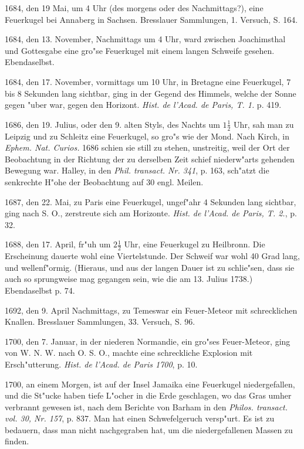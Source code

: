 \documentclass[a4paper, 11pt, oneside, polutonikogreek, german]{article}
\begin{document}
1684, den 19 Mai, um 4 Uhr (des morgens oder des Nachmittags?), eine Feuerkugel bei Annaberg in Sachsen. Bresslauer Sammlungen, 1. Versuch, S. 164.

1684, den 13. November, Nachmittags um 4 Uhr, ward zwischen Joachimsthal und Gottesgabe eine gro"se Feuerkugel mit einem langen Schweife gesehen. Ebendaselbst.

1684, den 17. November, vormittags um 10 Uhr, in Bretagne eine Feuerkugel, 7 bis 8 Sekunden lang sichtbar, ging in der Gegend des Himmels, welche der Sonne gegen "uber war, gegen den Horizont. \emph{Hist. de l'Acad. de Paris, T. 1.} p. 419.

1686, den 19. Julius, oder den 9. alten Styls, des Nachts um $\mathfrak{1\frac{1}{2}}$ Uhr, sah man zu Leipzig und zu Schleitz eine Feuerkugel, so gro"s wie der Mond. Nach Kirch, in \emph{Ephem. Nat. Curios.} 1686 schien sie still zu stehen, unstreitig, weil der Ort der Beobachtung in der Richtung der zu derselben Zeit schief niederw"arts gehenden Bewegung war. Halley, in den \emph{Phil. transact. Nr. 341}, p. 163, sch"atzt die senkrechte H"ohe der Beobachtung auf 30 engl. Meilen.

1687, den 22. Mai, zu Paris eine Feuerkugel, ungef"ahr 4 Sekunden lang sichtbar, ging nach S. O., zerstreute sich am Horizonte. \emph{Hist. de l'Acad. de Paris, T. 2.}, p. 32.

1688, den 17. April, fr"uh um $\mathfrak{2\frac{1}{2}}$ Uhr, eine Feuerkugel zu Heilbronn. Die Erscheinung dauerte wohl eine Viertelstunde. Der Schweif war wohl 40 Grad lang, und wellenf"ormig. (Hieraus, und aus der langen Dauer ist zu schlie"sen, dass sie auch so sprungweise mag gegangen sein, wie die am 13. Julius 1738.) Ebendaselbst p. 74.

1692, den 9. April Nachmittags, zu Temeswar ein Feuer-Meteor mit schrecklichen Knallen. Bresslauer Sammlungen, 33. Versuch, S. 96.

1700, den 7. Januar, in der niederen Normandie, ein gro"ses Feuer-Meteor, ging von W. N. W. nach O. S. O., machte eine schreckliche Explosion mit Ersch"utterung. \emph{Hist. de l'Acad. de Paris 1700}, p. 10.

1700, an einem Morgen, ist auf der Insel Jamaika eine Feuerkugel niedergefallen, und die St"ucke haben tiefe L"ocher in die Erde geschlagen, wo das Gras umher verbrannt gewesen ist, nach dem Berichte von Barham in den \emph{Philos. transact. vol. 30, Nr. 157}, p. 837. Man hat einen Schwefelgeruch versp"urt. Es ist zu bedauern, dass man nicht nachgegraben hat, um die niedergefallenen Massen zu finden.
\end{document}
